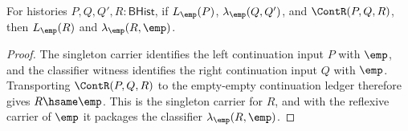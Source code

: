 \begin{theorem}
\label{thm:linearmap-singleton-classifier-continuation-right-closed}
For histories $P,Q,Q',R:\mathsf{BHist}$, if $L_{\emp}(P)$,
$\lambda_{\emp}(Q,Q')$, and $\ContR(P,Q,R)$, then $L_{\emp}(R)$ and
$\lambda_{\emp}(R,\emp)$.
\end{theorem}
\begin{proof}
The singleton carrier identifies the left continuation input $P$ with $\emp$,
and the classifier witness identifies the right continuation input $Q$ with
$\emp$. Transporting $\ContR(P,Q,R)$ to the empty-empty continuation ledger
therefore gives $R\hsame\emp$. This is the singleton carrier for $R$, and with
the reflexive carrier of $\emp$ it packages the classifier
$\lambda_{\emp}(R,\emp)$.
\end{proof}
